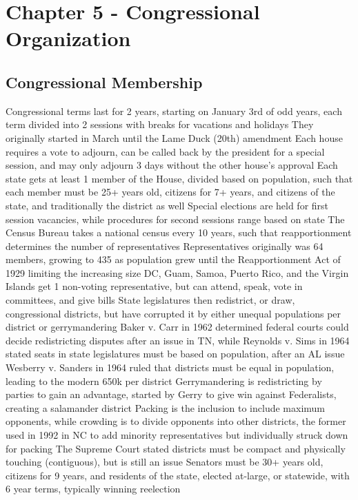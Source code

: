 \documentclass[11 pt, twoside]{article}
\newenvironment{outline*}
{
	\begin{outline}[enumerate]
	}
	{\end{outline}
}
\begin{document}
\section{Chapter 5 - Congressional Organization}
\subsection{Congressional Membership}
\begin{outline*}
\1 Congressional terms last for 2 years, starting on January 3rd of odd years, each term divided into 2 sessions with breaks for vacations and holidays
\2 They originally started in March until the Lame Duck (20th) amendment
\2 Each house requires a vote to adjourn, can be called back by the president for a special session, and may only adjourn 3 days without the other house’s approval
\1 Each state gets at least 1 member of the House, divided based on population, such that each member must be 25+ years old, citizens for 7+ years, and citizens of the state, and traditionally the district as well
\2 Special elections are held for first session vacancies, while procedures for second sessions range based on state
\2 The Census Bureau takes a national census every 10 years, such that reapportionment determines the number of representatives
\2 Representatives originally was 64 members, growing to 435 as population grew until the Reapportionment Act of 1929 limiting the increasing size
\2 DC, Guam, Samoa, Puerto Rico, and the Virgin Islands get 1 non-voting representative, but can attend, speak, vote in committees, and give bills
\1 State legislatures then redistrict, or draw, congressional districts, but have corrupted it by either unequal populations per district or gerrymandering
\2 Baker v. Carr in 1962 determined federal courts could decide redistricting disputes after an issue in TN, while Reynolds v. Sims in 1964 stated seats in state legislatures must be based on population, after an AL issue
\2 Wesberry v. Sanders in 1964 ruled that districts must be equal in population, leading to the modern 650k per district
\2 Gerrymandering is redistricting by parties to gain an advantage, started by Gerry to give win against Federalists, creating a salamander district
\2 Packing is the inclusion to include maximum opponents, while crowding is to divide opponents into other districts, the former used in 1992 in NC to add minority representatives but individually struck down for packing
\2 The Supreme Court stated districts must be compact and physically touching (contiguous), but is still an issue
\1 Senators must be 30+ years old, citizens for 9 years, and residents of the state, elected at-large, or statewide, with 6 year terms, typically winning reelection

\end{outline*}
\end{document}
